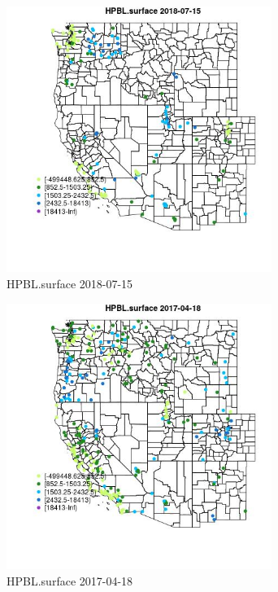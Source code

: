 \begin{figure} 
\centering  
\includegraphics[width=0.77\textwidth]{Code_Outputs/Report_ML_input_PM25_Step4_part_e_de_duplicated_aves_compiled_2019-05-20wNAs_MapObsHPBLsurface2018-07-15.jpg} 
\caption{\label{fig:Report_ML_input_PM25_Step4_part_e_de_duplicated_aves_compiled_2019-05-20wNAsMapObsHPBLsurface2018-07-15}HPBL.surface 2018-07-15} 
\end{figure} 
 

\clearpage 

\begin{figure} 
\centering  
\includegraphics[width=0.77\textwidth]{Code_Outputs/Report_ML_input_PM25_Step4_part_e_de_duplicated_aves_compiled_2019-05-20wNAs_MapObsHPBLsurface2017-04-18.jpg} 
\caption{\label{fig:Report_ML_input_PM25_Step4_part_e_de_duplicated_aves_compiled_2019-05-20wNAsMapObsHPBLsurface2017-04-18}HPBL.surface 2017-04-18} 
\end{figure} 
 


